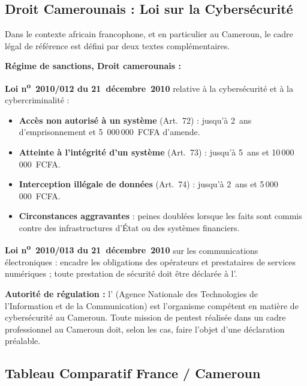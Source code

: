 \subsection{Droit Camerounais : Loi sur la Cybersécurité}
\label{subsec:loi_cameroun}

Dans le contexte africain francophone, et en particulier au Cameroun, le cadre
légal de référence est défini par deux textes complémentaires.

\begin{boxalert}
\textbf{Régime de sanctions, Droit camerounais :}

\medskip
\textbf{Loi n\textsuperscript{o}~2010/012 du 21~décembre~2010} relative à la
cybersécurité et à la cybercriminalité :
\begin{itemize}
    \item \textbf{Accès non autorisé à un système} (Art.~72) : jusqu'à
          2~ans d'emprisonnement et 5~000\,000~FCFA d'amende.
    \item \textbf{Atteinte à l'intégrité d'un système} (Art.~73) :
          jusqu'à 5~ans et 10\,000\,000~FCFA.
    \item \textbf{Interception illégale de données} (Art.~74) :
          jusqu'à 2~ans et 5\,000\,000~FCFA.
    \item \textbf{Circonstances aggravantes} : peines doublées lorsque
          les faits sont commis contre des infrastructures d'État ou des
          systèmes financiers.
\end{itemize}

\medskip
\textbf{Loi n\textsuperscript{o}~2010/013 du 21~décembre~2010} sur les
communications électroniques : encadre les obligations des opérateurs
et prestataires de services numériques ; toute prestation de sécurité
doit être déclarée à l'.

\medskip
\textbf{Autorité de régulation :} l' (Agence Nationale des
Technologies de l'Information et de la Communication) est l'organisme
compétent en matière de cybersécurité au Cameroun. Toute mission de
pentest réalisée dans un cadre professionnel au Cameroun doit, selon les
cas, faire l'objet d'une déclaration préalable.
\end{boxalert}

\subsection{Tableau Comparatif France / Cameroun}
\label{subsec:comparatif}

